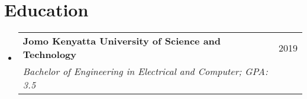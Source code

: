 \documentclass[letterpaper,11pt]{article}
\makeatletter
\newcommand{\resumeSubheading}[4]{
  \vspace{-1pt}\item
    \begin{tabular*}{0.97\textwidth}{l@{\extracolsep{\fill}}r}
      \textbf{#1} & #2 \\
      \textit{\small#3} & \textit{\small #4} \\
    \end{tabular*}\vspace{-5pt}
}
\newcommand{\resumeSubHeadingListStart}{\begin{itemize}[leftmargin=*]}
\newcommand{\resumeSubHeadingListEnd}{\end{itemize}}
\makeatother
\begin{document}
\section{Education}
  \resumeSubHeadingListStart
    \resumeSubheading
      {Jomo Kenyatta University of Science and Technology}{2019}
      {Bachelor of Engineering in Electrical and Computer;  GPA: 3.5}
      \
  \resumeSubHeadingListEnd

%


\end{document}
